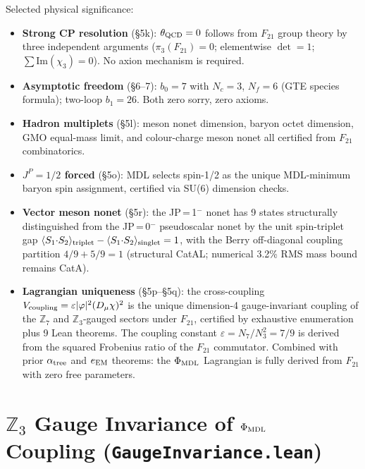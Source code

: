 \documentclass[11pt,a4paper]{article}
\theoremstyle{definition}
\begin{document}
Selected physical significance:
\begin{itemize}[nosep]
\item \textbf{Strong CP resolution} (§5k): $\theta_{\rm QCD} = 0$ follows
  from $F_{21}$ group theory by three independent arguments
  ($\pi_3(F_{21}) = 0$; elementwise $\det = 1$;
  $\sum \mathrm{Im}(\chi_3) = 0$).  No axion mechanism is required.
\item \textbf{Asymptotic freedom} (§6–7): $b_0 = 7$ with $N_c = 3$, $N_f = 6$
  (GTE species formula); two-loop $b_1 = 26$.  Both zero sorry, zero axioms.
\item \textbf{Hadron multiplets} (§5l): meson nonet dimension, baryon octet
  dimension, GMO equal-mass limit, and colour-charge meson nonet all certified
  from $F_{21}$ combinatorics.
\item \textbf{$J^P = 1/2$ forced} (§5o): MDL selects spin-1/2 as the unique
  MDL-minimum baryon spin assignment, certified via SU(6) dimension checks.
\item \textbf{Vector meson nonet} (§5r): the JP\,=\,1$^-$ nonet has 9 states
  structurally distinguished from the JP\,=\,0$^-$ pseudoscalar nonet by the
  unit spin-triplet gap $\langle S_1{\cdot}S_2\rangle_{\rm triplet} -
  \langle S_1{\cdot}S_2\rangle_{\rm singlet} = 1$, with the Berry off-diagonal
  coupling partition $4/9 + 5/9 = 1$ (structural CatAL;
  numerical 3.2\% RMS mass bound remains CatA).
\item \textbf{Lagrangian uniqueness} (§5p–§5q): the cross-coupling
  $V_{\rm coupling} = \varepsilon|\varphi|^2(D_\mu\chi)^2$ is the unique
  dimension-4 gauge-invariant coupling of the $\mathbb{Z}_7$ and
  $\mathbb{Z}_3$-gauged sectors under $F_{21}$, certified by exhaustive
  enumeration plus 9 Lean theorems.  The coupling constant
  $\varepsilon = N_7/N_3^2 = 7/9$ is derived from the squared Frobenius
  ratio of the $F_{21}$ commutator.  Combined with prior
  $\alpha_{\rm tree}$ and $e_{\rm EM}$ theorems: the $\Phi_{\rm MDL}$
  Lagrangian is fully derived from $F_{21}$ with zero free parameters.
\end{itemize}

\section{$\mathbb{Z}_3$ Gauge Invariance of $\Phi_{\rm MDL}$ Coupling
  (\texttt{GaugeInvariance.lean})}\label{sec:gauge-invariance}
\end{document}
